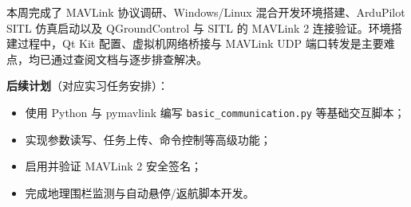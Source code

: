 \documentclass[12pt,a4paper]{article}
\begin{document}
本周完成了 MAVLink 协议调研、Windows/Linux 混合开发环境搭建、ArduPilot SITL 仿真启动以及 QGroundControl 与 SITL 的 MAVLink 2 连接验证。环境搭建过程中，Qt Kit 配置、虚拟机网络桥接与 MAVLink UDP 端口转发是主要难点，均已通过查阅文档与逐步排查解决。

\textbf{后续计划}（对应实习任务安排）：
\begin{itemize}[leftmargin=2em]
    \item 使用 Python 与 pymavlink 编写 \texttt{basic\_communication.py} 等基础交互脚本；
    \item 实现参数读写、任务上传、命令控制等高级功能；
    \item 启用并验证 MAVLink 2 安全签名；
    \item 完成地理围栏监测与自动悬停/返航脚本开发。
\end{itemize}
\end{document}
